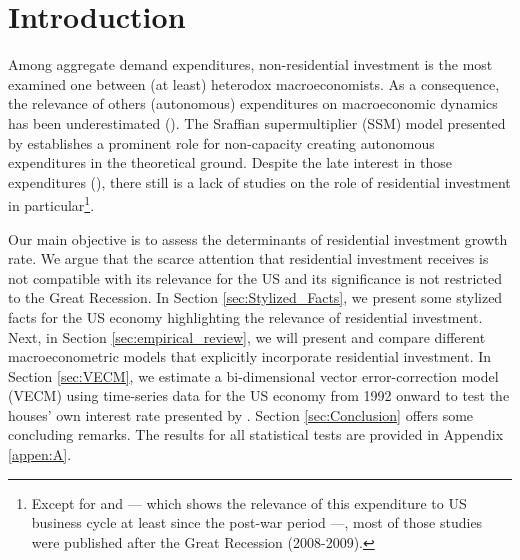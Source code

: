 \section{Introduction}\label{sec:Introduction}


Among aggregate demand expenditures, non-residential investment is the most examined  one between (at least) heterodox macroeconomists.
As a consequence, the relevance of others (autonomous) expenditures on macroeconomic dynamics has been underestimated (\cite{brochier_macroeconomics_2017}).
The Sraffian supermultiplier (SSM) model presented by \textcite{serrano_long_1995} establishes a prominent role for non-capacity creating autonomous expenditures in the theoretical ground.
Despite the late interest in those expenditures (\cites{freitas_pattern_2013}{girardi_long-run_2016}{girardi_autonomous_2018}{braga_investment_2018}), there still is a lack of studies on the role of residential investment in particular\footnote{Except for \textcite{green_follow_1997} and \textcite{leamer_housing_2007} --- which shows the relevance of this expenditure to US business cycle at least since the post-war period ---, most of those studies were published after the Great Recession (2008-2009).}. 

Our main objective is to assess the determinants of residential investment growth rate.
We argue that the scarce attention that residential investment receives is not compatible with its relevance for the US and its significance is not restricted to the Great Recession.
In Section \ref{sec:Stylized_Facts}, we present some stylized facts for the US economy highlighting the relevance of residential investment.
Next, in Section \ref{sec:empirical_review}, we will present and compare different macroeconometric models that explicitly incorporate residential investment.
In Section \ref{sec:VECM}, we estimate a bi-dimensional vector error-correction model (VECM) using time-series data for the US economy from 1992 onward to test the houses' own interest rate presented by \textcite{teixeira_crescimento_2015}. 
Section \ref{sec:Conclusion} offers some concluding remarks.
The results for all statistical tests are provided in Appendix \ref{appen:A}.



